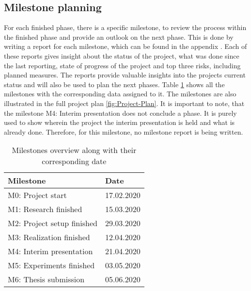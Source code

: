 \subsection{Milestone planning}
\label{sec:Milestone-Planning}
For each finished phase, there is a specific milestone, to review the process within the finished phase and provide an outlook on the next phase. This is done by writing a report for each milestone, which can be found in the appendix . Each of these reports gives insight about the status of the project, what was done since the last reporting, state of progress of the project and top three risks, including planned measures. The reports provide valuable insights into the projects current status and will also be used to plan the next phases. Table \ref{tab:Milestones} shows all the milestones with the corresponding data assigned to it. The milestones are also illustrated in the full project plan \ref{fig:Project-Plan}.
\newline
\newline
It is important to note, that the milestone M4: Interim presentation does not conclude a phase. It is purely used to show wherein the project the interim presentation is held and what is already done. Therefore, for this milestone, no milestone report is being written.

\begin{table}[htbp]
    \centering
    \caption{Milestones overview along with their corresponding date}
	\label{tab:Milestones}
    \begin{tabular}{p{} | p{}}
        \toprule
        \textbf{Milestone} & \textbf{Date} \\ 
        \midrule[1pt]
        M0: Project start & 17.02.2020\\
        \hline
        M1: Research finished & 15.03.2020\\
        \hline
        M2: Project setup finished & 29.03.2020\\
        \hline
        M3: Realization finished & 12.04.2020\\
        \hline
        M4: Interim presentation & 21.04.2020\\
        \hline
        M5: Experiments finished & 03.05.2020\\
        \hline
        M6: Thesis submission & 05.06.2020\\
        \bottomrule
    \end{tabular}
\end{table}


